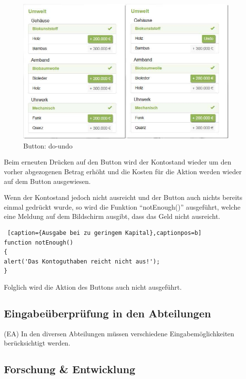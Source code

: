 \begin{figure} [H]
	\centering
	\includegraphics[scale=0.38]{img/button-do-undo.jpeg} 
	\caption{Button: do-undo} \label{fig:abb30}
\end{figure}

Beim erneuten Drücken auf den Button wird der Kontostand wieder um den vorher abgezogenen Betrag erhöht und die Kosten für die Aktion werden wieder auf dem Button ausgewiesen. 

Wenn der Kontostand jedoch nicht ausreicht und der Button auch nichts bereits einmal gedrückt wurde, so wird die Funktion \enquote{notEnough()} ausgeführt, welche eine Meldung auf dem Bildschirm ausgibt, dass das Geld nicht ausreicht. 

\lstset{language=Java}
\begin{lstlisting} [caption={Ausgabe bei zu geringem Kapital},captionpos=b]
function notEnough()
{
alert('Das Kontoguthaben reicht nicht aus!');
}
\end{lstlisting}

Folglich wird die Aktion des Buttons auch nicht ausgeführt.

\subsection*{Eingabeüberprüfung in den Abteilungen}

(EA) In den diversen Abteilungen müssen verschiedene Eingabemöglichkeiten berücksichtigt werden. 

\subsection*{Forschung \& Entwicklung}

